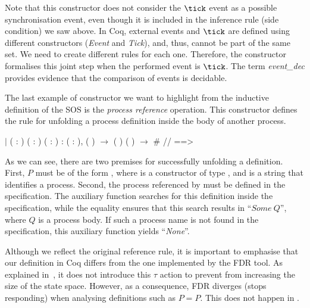 Note that this constructor does not consider the $ \tick $ event as a possible synchronisation event, even though it is included in the inference rule (side condition) we saw above. In Coq, external events and $\tick$ are defined using different constructors (\emph{Event} and \emph{Tick}), and, thus, cannot be part of the same set. We need to create different rules for each one. Therefore, the constructor  formalises this joint step when the performed event is $\tick$. The term \emph{event\_dec} provides evidence that the comparison of events is decidable.

The last example of constructor we want to highlight from the inductive definition of the SOS is the \emph{process reference} operation. This constructor defines the rule for unfolding a process definition inside the body of another process.

\begin{coqdoccode}
	\coqdocnoindent
	\ensuremath{|}  ( : ) ( : ) ( : ) :\coqdoceol
	\coqdocindent{1.00em}
	\coqdockw{\ensuremath{\forall}} ( : ),\coqdoceol
	\coqdocindent{3.00em}
	  ( ) \ensuremath{\rightarrow}\coqdoceol
	\coqdocindent{3.00em}
	 (  ) ( ) \ensuremath{\rightarrow}\coqdoceol
	\coqdocindent{3.00em}
	 \#  //  ==> \coqdoceol
\end{coqdoccode}

As we can see, there are two premises for successfully unfolding a definition. First, $P$ must be of the form  , where  is a constructor of type , and  is a string that identifies a process. Second, the process referenced by   must be defined in the specification. The auxiliary function  searches for this definition inside the specification, while the equality ensures that this search results in ``$ Some \ Q $'', where $ Q $ is a process body. If such a process name is not found in the specification, this auxiliary function yields ``\emph{None}''.

Although we reflect the original reference rule, it is important to emphasise that our definition in Coq differs from the one implemented by the FDR tool. As explained in~, it does not introduce this $\tau$ action to prevent from increasing the size of the state space. However, as a consequence, FDR diverges (stops responding) when analysing definitions such as $P = P$. This does not happen in \CSPcoq{}.

